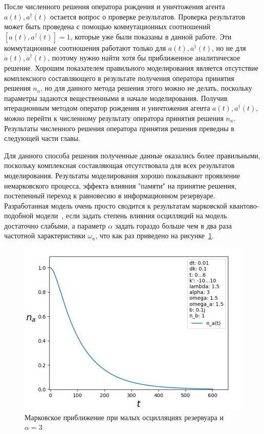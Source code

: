 После численного решения оператора рождения и уничтожения агента $a(t), a^{\dagger}(t)$ остается
вопрос о проверке результатов.
Проверка результатов может быть проведена с помощью коммутационных соотношений $[a(t), a^{\dagger}(t)] = 1$,
которые уже были показаны в данной работе.
Эти коммутационные соотношения работают только для $a(t), a^{\dagger}(t)$, но не для
$\dot{a}(t), \dot{a}^{\dagger}(t)$, поэтому нужно найти хотя бы приближенное аналитическое решение.
Хорошим показателем правильного моделирования является отсутствие комплексного составляющего в результате
получения оператора принятия решения $n_{a}$, но для данного метода решения этого можно не делать,
поскольку параметры задаются вещественными в начале моделирования.
Получив итерационным методом оператор рождения и уничтожения агента $a(t), a^{\dagger}(t)$, можно
перейти к численному результату оператора принятия решения $n_{a}$.
Результаты численного решения оператора принятия решения преведны в следующей части главы.


Для данного способа решения полученные данные оказались более правильными, поскольку комплексная составляющая
отсутствовала для всех результатов моделирования.
Результаты моделирования хорошо показывают проявление немарковского процесса, эффекта влияния "памяти"
на принятие решения, постепенный переход к равновесию в информационном резервуаре.
Разработанная модель очень просто сводится к результатам марковской квантово-подобной модели~\citep{bagarello2018quantum},
если задать степень влияния осцилляций на модель достаточно слабыми, а параметр $\alpha$ задать гораздо
больше чем в два раза частотной характеристики $\omega_{a}$, что как раз приведено на рисунке~\ref{fig:sr_mark}.
\begin{figure}[h!]
    \centering
    \captionsetup{justification=centering}
    \includegraphics[width=0.7\linewidth]{pictures/result_second_1.png}
    \caption{Марковское приближение при малых осцилляциях резервуара и $\alpha = 3$}
    \label{fig:sr_mark}
\end{figure}

